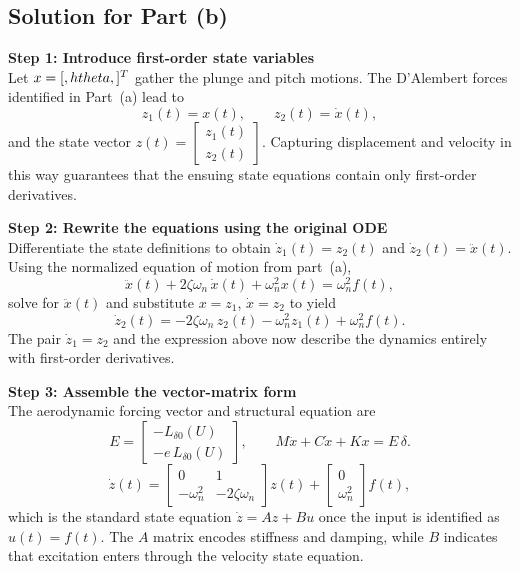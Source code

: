 \documentclass[12pt]{article}
\begin{document}
\clearpage
\clearpage
\subsection*{Solution for Part (b)}

\begin{stepbox}
\textbf{Step 1: Introduce first-order state variables}\\[0.5em]
Let $x = [\\,h\\ \\ \\theta\\,]^T$ gather the plunge and pitch motions.  The D'Alembert forces identified in Part~(a) lead to
\[
z_1(t) = x(t), \qquad z_2(t) = \dot{x}(t),
\]
and the state vector $z(t) = \begin{bmatrix} z_1(t) \\ z_2(t) \end{bmatrix}$.  Capturing displacement and velocity in this way guarantees that the ensuing state equations contain only first-order derivatives.
\end{stepbox}

\begin{stepbox}
\textbf{Step 2: Rewrite the equations using the original ODE}\\[0.5em]
Differentiate the state definitions to obtain $\dot{z}_1(t) = z_2(t)$ and $\dot{z}_2(t) = \ddot{x}(t)$.  Using the normalized equation of motion from part~(a),
\[
\ddot{x}(t) + 2\zeta\omega_n\,\dot{x}(t) + \omega_n^2 x(t) = \omega_n^2 f(t),
\]
solve for $\ddot{x}(t)$ and substitute $x = z_1$, $\dot{x} = z_2$ to yield
\[
\dot{z}_2(t) = -2\zeta\omega_n\,z_2(t) - \omega_n^2 z_1(t) + \omega_n^2 f(t).
\]
The pair $\dot{z}_1 = z_2$ and the expression above now describe the dynamics entirely with first-order derivatives.
\end{stepbox}

\begin{stepbox}
\textbf{Step 3: Assemble the vector-matrix form}\\[0.5em]
The aerodynamic forcing vector and structural equation are
\[
E = \begin{bmatrix} -L_{\delta 0}(U) \\ -e\,L_{\delta 0}(U) \end{bmatrix}, \qquad
M\ddot{x} + C\dot{x} + Kx = E\,\delta.
\]
\[
\dot{z}(t) =
\begin{bmatrix}
0 & 1 \\
-\omega_n^2 & -2\zeta\omega_n
\end{bmatrix} z(t) +
\begin{bmatrix}
0 \\
\omega_n^2
\end{bmatrix} f(t),
\]
which is the standard state equation $\dot{z} = A z + B u$ once the input is identified as $u(t) = f(t)$.  The $A$ matrix encodes stiffness and damping, while $B$ indicates that excitation enters through the velocity state equation.
\end{stepbox}
\end{document}
